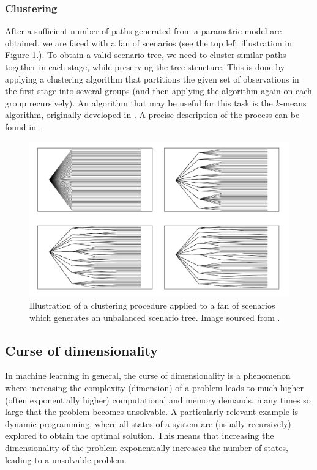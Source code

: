 \subsubsection{Clustering}
After a sufficient number of paths generated from a parametric model are obtained, we are faced with a fan of scenarios (see the top left illustration in Figure \ref{fig:fan_of_scenarios_clustering}.). To obtain a valid scenario tree, we need to cluster similar paths together in each stage, while preserving the tree structure. This is done by applying a clustering algorithm that partitions the given set of observations in the first stage into several groups (and then applying the algorithm again on each group recursively). An algorithm that may be useful for this task is the $k$-means algorithm, originally developed in \cite{kmeans}. A precise description of the process can be found in \cite[Section 3]{kmeans_clustering}.

\begin{figure}
  \includegraphics[width=\linewidth]{../img/fan_of_scenarios_clustering.png}
  \caption{Illustration of a clustering procedure applied to a fan of scenarios which generates an unbalanced scenario tree.  Image sourced from \cite[Figure 5]{fan_of_scenarios}.}
  \label{fig:fan_of_scenarios_clustering}
\end{figure}
\subsection{Curse of dimensionality}
In machine learning in general, the curse of dimensionality is a phenomenon where increasing the complexity (dimension) of a problem leads to much higher (often exponentially higher) computational and memory demands, many times so large that the problem becomes unsolvable. A particularly relevant example is dynamic programming, where all states of a system are (usually recursively) explored to obtain the optimal solution. This means that increasing the dimensionality of the problem exponentially increases the number of states, leading to a unsolvable problem.

